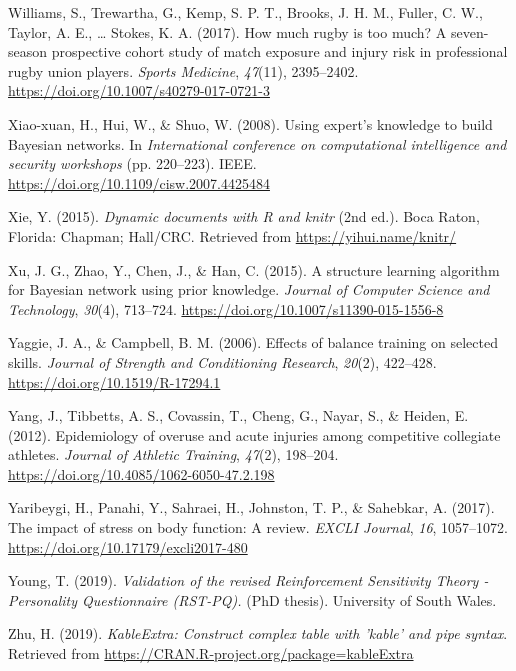 \documentclass[
  english,
  man,floatsintext]{apa6}
\begin{document}
\leavevmode\hypertarget{ref-Williams2017b}{}%
Williams, S., Trewartha, G., Kemp, S. P. T., Brooks, J. H. M., Fuller, C. W., Taylor, A. E., \ldots{} Stokes, K. A. (2017). How much rugby is too much? A seven-season prospective cohort study of match exposure and injury risk in professional rugby union players. \emph{Sports Medicine}, \emph{47}(11), 2395--2402. \url{https://doi.org/10.1007/s40279-017-0721-3}

\leavevmode\hypertarget{ref-Xiao-xuan2007}{}%
Xiao-xuan, H., Hui, W., \& Shuo, W. (2008). Using expert's knowledge to build Bayesian networks. In \emph{International conference on computational intelligence and security workshops} (pp. 220--223). IEEE. \url{https://doi.org/10.1109/cisw.2007.4425484}

\leavevmode\hypertarget{ref-R-knitr}{}%
Xie, Y. (2015). \emph{Dynamic documents with R and knitr} (2nd ed.). Boca Raton, Florida: Chapman; Hall/CRC. Retrieved from \url{https://yihui.name/knitr/}

\leavevmode\hypertarget{ref-Xu2015}{}%
Xu, J. G., Zhao, Y., Chen, J., \& Han, C. (2015). A structure learning algorithm for Bayesian network using prior knowledge. \emph{Journal of Computer Science and Technology}, \emph{30}(4), 713--724. \url{https://doi.org/10.1007/s11390-015-1556-8}

\leavevmode\hypertarget{ref-Yaggie2006}{}%
Yaggie, J. A., \& Campbell, B. M. (2006). Effects of balance training on selected skills. \emph{Journal of Strength and Conditioning Research}, \emph{20}(2), 422--428. \url{https://doi.org/10.1519/R-17294.1}

\leavevmode\hypertarget{ref-Yang2012}{}%
Yang, J., Tibbetts, A. S., Covassin, T., Cheng, G., Nayar, S., \& Heiden, E. (2012). Epidemiology of overuse and acute injuries among competitive collegiate athletes. \emph{Journal of Athletic Training}, \emph{47}(2), 198--204. \url{https://doi.org/10.4085/1062-6050-47.2.198}

\leavevmode\hypertarget{ref-Yaribeygi2017}{}%
Yaribeygi, H., Panahi, Y., Sahraei, H., Johnston, T. P., \& Sahebkar, A. (2017). The impact of stress on body function: A review. \emph{EXCLI Journal}, \emph{16}, 1057--1072. \url{https://doi.org/10.17179/excli2017-480}

\leavevmode\hypertarget{ref-Young2019}{}%
Young, T. (2019). \emph{Validation of the revised Reinforcement Sensitivity Theory - Personality Questionnaire (RST-PQ).} (PhD thesis). University of South Wales.

\leavevmode\hypertarget{ref-R-kableExtra}{}%
Zhu, H. (2019). \emph{KableExtra: Construct complex table with 'kable' and pipe syntax}. Retrieved from \url{https://CRAN.R-project.org/package=kableExtra}
\end{document}
